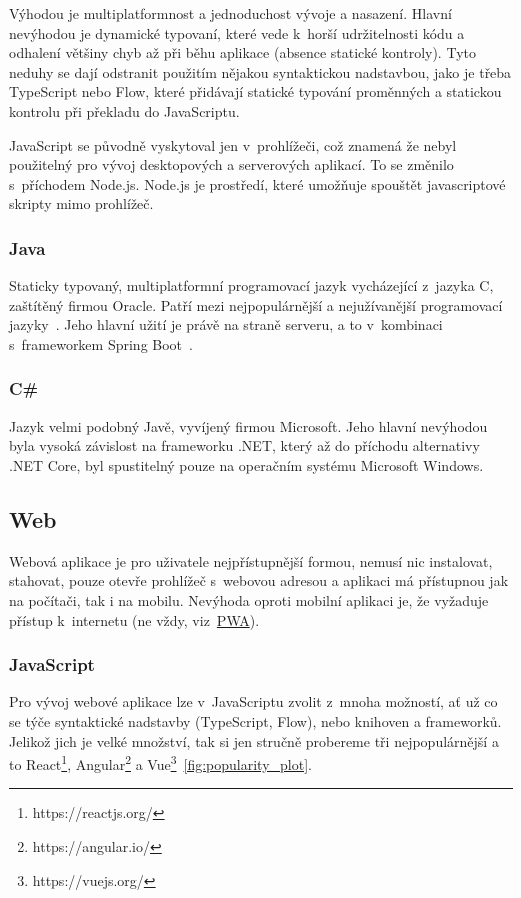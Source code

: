 Výhodou je multiplatformnost a jednoduchost vývoje a nasazení. Hlavní nevýhodou je dynamické typovaní, které vede k~horší udržitelnosti kódu a odhalení většiny chyb až při běhu aplikace (absence statické kontroly). Tyto neduhy se dají odstranit použitím nějakou syntaktickou nadstavbou, jako je třeba TypeScript nebo Flow, které přidávají statické typování proměnných a statickou kontrolu při překladu do JavaScriptu.

JavaScript se původně vyskytoval jen v~prohlížeči, což znamená že nebyl použitelný pro vývoj desktopových a serverových aplikací. To se změnilo s~příchodem Node.js. Node.js je prostředí, které umožňuje spouštět javascriptové skripty mimo prohlížeč.

\subsubsection*{Java}
Staticky typovaný, multiplatformní programovací jazyk vycházející z~jazyka C, zaštítěný firmou Oracle. Patří mezi nejpopulárnější a nejužívanější programovací jazyky~\cite{stackexchangeinc_2019_stack}. Jeho hlavní užití je právě na straně serveru, a to v~kombinaci s~frameworkem Spring Boot~\cite{jetbrainssro_2019_demographics}.

\subsubsection*{C\# }
Jazyk velmi podobný Javě, vyvíjený firmou Microsoft. Jeho hlavní nevýhodou byla vysoká závislost na frameworku .NET, který až do příchodu alternativy .NET Core, byl spustitelný pouze na operačním systému Microsoft Windows.

\subsection{Web}
\label{ss:web}
Webová aplikace je pro uživatele nejpřístupnější formou, nemusí nic instalovat, stahovat, pouze otevře prohlížeč s~webovou adresou a aplikaci má přístupnou jak na počítači, tak i na mobilu. Nevýhoda oproti mobilní aplikaci je, že vyžaduje přístup k~internetu (ne vždy, viz~\hyperref[sss:pwa]{PWA}).

\subsubsection*{JavaScript}
\label{ss:javascript}
Pro vývoj webové aplikace lze v~JavaScriptu zvolit z~mnoha možností, ať už co se týče syntaktické nadstavby (TypeScript, Flow), nebo knihoven a frameworků. Jelikož jich je velké množství, tak si jen stručně probereme tři nejpopulárnější a to React\footnote{https://reactjs.org/}, Angular\footnote{https://angular.io/} a Vue\footnote{https://vuejs.org/}~\ref{fig:popularity_plot}.

